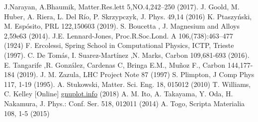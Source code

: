 \documentclass[aps,prl,twocolumn,superscriptaddress,groupedaddress]{revtex4}
\begin{document}
\begin{thebibliography}{99}
 J.Narayan, A.Bhaumik, Matter.Res.lett 5,NO.4,242–250 (2017).
 J. Goold, M. Huber, A. Riera, L. Del Río, P. Skrzypczyk, J. Phys. 49,14 (2016)
 K. Ptaszyński, M. Espósito, PRL 122,150603 (2019).
 S. Boucetta , J. Magnesium and Alloys 2,59e63 (2014). 
 J.E. Lennard-Jones, Proc.R.Soc.Lond. A 106,(738):463–477 (1924) 
 F. Ercolessi, Spring School in Computational Physics, ICTP, Trieste (1997).
 C. De Tomás, I. Suarez-Martínez ,N. Marks, Carbon 109,681-693 (2016).
 E. Tangarife ,R. González, Cardenas C, Bringa E.M., Muñoz F., Carbon 144,177-184 (2019).
 J. M. Zazula, LHC Project Note 87 (1997)
 S. Plimpton, J Comp Phys 117, 1-19 (1995).
 A. Stukowski, Matter. Sci. Eng. 18, 015012 (2010)
 T. Williams, C. Kelley [Online] \href{http://www.gnuplot.info/docs_5.3/gnuplot.pdf}{gnuplot.info} (2018)
 A. M. Ito, A. Takayama, Y. Oda, H. Nakamura, J. Phys.: Conf. Ser. 518, 012011 (2014)
 A. Togo, Scripta Materialia 108, 1-5 (2015)
\end{thebibliography}
\end{document}
